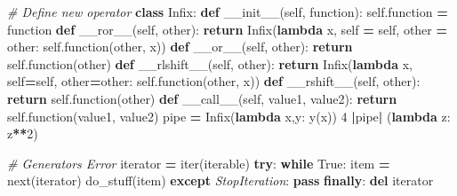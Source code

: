 \documentclass[]{book}
\newenvironment{Shaded}{\begin{snugshade}}{\end{snugshade}}
\newcommand{\KeywordTok}[1]{\textcolor[rgb]{0.13,0.29,0.53}{\textbf{#1}}}
\newcommand{\DecValTok}[1]{\textcolor[rgb]{0.00,0.00,0.81}{#1}}
\newcommand{\CommentTok}[1]{\textcolor[rgb]{0.56,0.35,0.01}{\textit{#1}}}
\newcommand{\FunctionTok}[1]{\textcolor[rgb]{0.00,0.00,0.00}{#1}}
\newcommand{\VariableTok}[1]{\textcolor[rgb]{0.00,0.00,0.00}{#1}}
\newcommand{\ControlFlowTok}[1]{\textcolor[rgb]{0.13,0.29,0.53}{\textbf{#1}}}
\newcommand{\OperatorTok}[1]{\textcolor[rgb]{0.81,0.36,0.00}{\textbf{#1}}}
\newcommand{\BuiltInTok}[1]{#1}
\newcommand{\PreprocessorTok}[1]{\textcolor[rgb]{0.56,0.35,0.01}{\textit{#1}}}
\newcommand{\NormalTok}[1]{#1}
\theoremstyle{definition}
\theoremstyle{definition}
\theoremstyle{definition}
\theoremstyle{remark}
\begin{document}
\begin{Shaded}
\begin{Highlighting}[]
\CommentTok{# Define new operator}
\KeywordTok{class}\NormalTok{ Infix:}
    \KeywordTok{def} \FunctionTok{__init__}\NormalTok{(}\VariableTok{self}\NormalTok{, function):}
        \VariableTok{self}\NormalTok{.function }\OperatorTok{=}\NormalTok{ function}
    \KeywordTok{def} \FunctionTok{__ror__}\NormalTok{(}\VariableTok{self}\NormalTok{, other):}
        \ControlFlowTok{return}\NormalTok{ Infix(}\KeywordTok{lambda}\NormalTok{ x, }\VariableTok{self} \OperatorTok{=} \VariableTok{self}\NormalTok{, other }\OperatorTok{=}\NormalTok{ other: }\VariableTok{self}\NormalTok{.function(other, x))}
    \KeywordTok{def} \FunctionTok{__or__}\NormalTok{(}\VariableTok{self}\NormalTok{, other):}
        \ControlFlowTok{return} \VariableTok{self}\NormalTok{.function(other)}
    \KeywordTok{def} \FunctionTok{__rlshift__}\NormalTok{(}\VariableTok{self}\NormalTok{, other):}
        \ControlFlowTok{return}\NormalTok{ Infix(}\KeywordTok{lambda}\NormalTok{ x, }\VariableTok{self}\OperatorTok{=}\VariableTok{self}\NormalTok{, other}\OperatorTok{=}\NormalTok{other: }\VariableTok{self}\NormalTok{.function(other, x))}
    \KeywordTok{def} \FunctionTok{__rshift__}\NormalTok{(}\VariableTok{self}\NormalTok{, other):}
        \ControlFlowTok{return} \VariableTok{self}\NormalTok{.function(other)}
    \KeywordTok{def} \FunctionTok{__call__}\NormalTok{(}\VariableTok{self}\NormalTok{, value1, value2):}
        \ControlFlowTok{return} \VariableTok{self}\NormalTok{.function(value1, value2)}
\NormalTok{pipe }\OperatorTok{=}\NormalTok{ Infix(}\KeywordTok{lambda}\NormalTok{ x,y: y(x))}
\DecValTok{4} \OperatorTok{|}\NormalTok{pipe}\OperatorTok{|}\NormalTok{ (}\KeywordTok{lambda}\NormalTok{ z: z}\OperatorTok{**}\DecValTok{2}\NormalTok{)}
\end{Highlighting}
\end{Shaded}

\begin{Shaded}
\begin{Highlighting}[]
\CommentTok{# Generators Error}
\NormalTok{iterator }\OperatorTok{=} \BuiltInTok{iter}\NormalTok{(iterable)}
\ControlFlowTok{try}\NormalTok{:}
    \ControlFlowTok{while} \VariableTok{True}\NormalTok{:}
\NormalTok{        item }\OperatorTok{=} \BuiltInTok{next}\NormalTok{(iterator)}
\NormalTok{        do_stuff(item)}
\ControlFlowTok{except} \PreprocessorTok{StopIteration}\NormalTok{:}
    \ControlFlowTok{pass}
\ControlFlowTok{finally}\NormalTok{:}
    \KeywordTok{del}\NormalTok{ iterator}
\end{Highlighting}
\end{Shaded}
\end{document}
